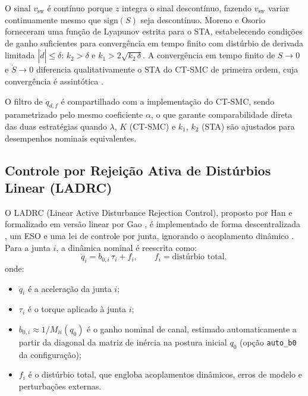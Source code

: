 O sinal $v_{\text{sw}}$ é contínuo porque $z$ integra o sinal descontínuo, fazendo $v_{\text{sw}}$ variar continuamente mesmo que $\text{sign}(S)$ seja descontínuo. Moreno e Osorio \cite{moreno2012strict} forneceram uma função de Lyapunov estrita para o STA, estabelecendo condições de ganho suficientes para convergência em tempo finito com distúrbio de derivada limitada $|\dot{d}| \leq \delta$: $k_2 > \delta$ e $k_1 > 2\sqrt{k_2\,\delta}$. A convergência em tempo finito de $S \to 0$ e $\dot{S} \to 0$ diferencia qualitativamente o STA do CT-SMC de primeira ordem, cuja convergência é assintótica \cite{levant1993sliding, utkin2017sliding}.

O filtro de $\ddot{q}_{d,f}$ é compartilhado com a implementação do CT-SMC, sendo parametrizado pelo mesmo coeficiente $\alpha$, o que garante comparabilidade direta das duas estratégias quando $\lambda$, $K$ (CT-SMC) e $k_1$, $k_2$ (STA) são ajustados para desempenhos nominais equivalentes.

\subsection{Controle por Rejeição Ativa de Distúrbios Linear (LADRC)}

O LADRC (Linear Active Disturbance Rejection Control), proposto por Han \cite{han1995class} e formalizado em versão linear por Gao \cite{gao2003scaling}, é implementado de forma descentralizada , um ESO e uma lei de controle por junta, ignorando o acoplamento dinâmico \cite{huang2014active}. Para a junta $i$, a dinâmica nominal é reescrita como:
\begin{equation}
    \ddot{q}_i = b_{0,i}\,\tau_i + f_i, \qquad f_i = \text{distúrbio total},
    \label{eq:adrc_plant_impl}
\end{equation}
onde:
\begin{itemize}
    \item $\ddot{q}_i$ é a aceleração da junta $i$;
    \item $\tau_i$ é o torque aplicado à junta $i$;
    \item $b_{0,i} \approx 1/M_{ii}(q_0)$ é o ganho nominal de canal, estimado automaticamente a partir da diagonal da matriz de inércia na postura inicial $q_0$ (opção \texttt{auto\_b0} da configuração);
    \item $f_i$ é o distúrbio total, que engloba acoplamentos dinâmicos, erros de modelo e perturbações externas.
\end{itemize}

